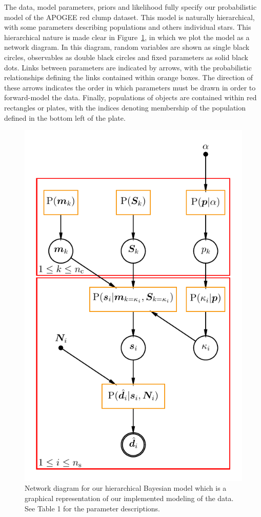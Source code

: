 \documentclass[a4paper,fleqn,usenatbib]{mnras}
\begin{document}
The data, model parameters, priors and likelihood fully specify our probabilistic model of the APOGEE red clump dataset. This model is naturally hierarchical, with some parameters describing populations and others individual stars. This hierarchical nature is made clear in Figure~\ref{fig:network_diagram}, in which we plot the model as a network diagram. In this diagram, random variables are shown as single black circles, observables as double black circles and fixed parameters as solid black dots. Links between parameters are indicated by arrows, with the probabilistic relationships defining the links contained within orange boxes. The direction of these arrows indicates the order in which parameters must be drawn in order to forward-model the data. Finally, populations of objects are contained within red rectangles or plates, with the indices denoting membership of the population defined in the bottom left of the plate.

\begin{figure}
	\includegraphics[width=\columnwidth]{bhm_plot.pdf}
    \caption{Network diagram for our hierarchical Bayesian model which is a graphical representation of our implemented modeling of the data. See Table 1 for the parameter descriptions.}
    \label{fig:network_diagram}
\end{figure}
\end{document}
